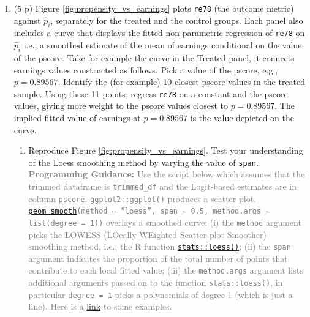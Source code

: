 \documentclass[
]{article}
\providecommand{\tightlist}{%
  \setlength{\itemsep}{0pt}\setlength{\parskip}{0pt}}
\begin{document}
\begin{enumerate}
\def\labelenumi{\arabic{enumi}.}
\setcounter{enumi}{1}
\item
  (5 p) Figure \ref{fig:propensity_vs_earnings} plots \texttt{re78} (the
  outcome metric) against \(\widehat{p}_{i}\), separately for the
  treated and the control groups. Each panel also includes a curve that
  displays the fitted non-parametric regression of \texttt{re78} on
  \(\widehat{p}_{i}\) i.e., a smoothed estimate of the mean of earnings
  conditional on the value of the pscore. Take for example the curve in
  the Treated panel, it connects earnings values constructed as follows.
  Pick a value of the pscore, e.g., \(p=0.89567\). Identify the (for
  example) 10 closest pscore values in the treated sample. Using these
  11 points, regress \texttt{re78} on a constant and the pscore values,
  giving more weight to the pscore values closest to \(p=0.89567\). The
  implied fitted value of earnings at \(p=0.89567\) is the value
  depicted on the curve.

  \begin{enumerate}
  \def\labelenumii{\alph{enumii}.}
  \tightlist
  \item
    Reproduce Figure \ref{fig:propensity_vs_earnings}. Test your
    understanding of the Loess smoothing method by varying the value of
    \texttt{span}.
    \textcolor{gray}{\textbf{Programming Guidance:} Use the script below which assumes that the trimmed dataframe is \texttt{trimmed\_df} and the Logit-based estimates are in column \texttt{pscore}. \texttt{ggplot2::ggplot()} produces a scatter plot. \href{https://ggplot2.tidyverse.org/reference/geom_smooth.html}{\texttt{geom\_smooth}}\texttt{(method = ``loess'', span = 0.5, method.args = list(degree = 1))} overlays a smoothed curve: (i) the \texttt{method} argument picks the LOWESS (LOcally WEighted Scatter-plot Smoother) smoothing method, i.e., the R function \href{https://www.rdocumentation.org/packages/stats/versions/3.6.2/topics/loess}{\texttt{stats::loess()}}; (ii) the \texttt{span} argument indicates the proportion of the total number of points that contribute to each local fitted value; (iii) the \texttt{method.args} argument lists additional arguments passed on to the function \texttt{stats::loess()}, in particular \texttt{degree = 1} picks a polynomials of degree 1 (which is just a line). Here is a \href{https://ggplot2.tidyverse.org/reference/geom_smooth.html}{link} to some examples.}
  \end{enumerate}
\end{enumerate}
\end{document}

